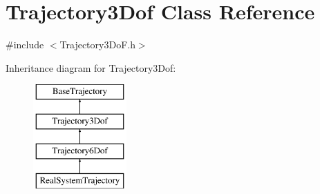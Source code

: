 \hypertarget{class_trajectory3_dof}{}\section{Trajectory3\+Dof Class Reference}
\label{class_trajectory3_dof}


{\ttfamily \#include $<$Trajectory3\+Do\+F.\+h$>$}

Inheritance diagram for Trajectory3\+Dof\+:\begin{figure}[H]
\begin{center}
\leavevmode
\includegraphics[height=4.000000cm]{class_trajectory3_dof}
\end{center}
\end{figure}
